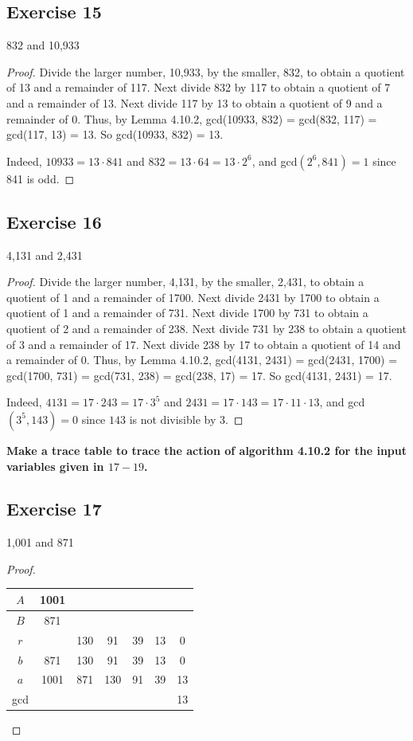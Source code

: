 \documentclass[14pt]{extarticle}
\newcommand{\cy}{\color{cyan}}
\begin{document}
\subsection{Exercise 15}
832 and 10,933

\begin{proof}
Divide the larger number, 10,933, by the smaller, 832, to obtain a quotient of 13 and a remainder of 117. Next divide 832 by 117 to obtain a quotient of 7 and a remainder of 13. Next divide 117 by 13 to obtain a quotient of 9 and a remainder of 0. Thus, by Lemma 4.10.2, gcd(10933, 832) = gcd(832, 117) = gcd(117, 13) = 13. So gcd(10933, 832) = 13.

Indeed, $10933 = 13 \cdot 841$ and $832 = 13 \cdot 64 = 13 \cdot 2^6$, and gcd$(2^6, 841) = 1$ since 841 is odd.
\end{proof}

\subsection{Exercise 16}
4,131 and 2,431

\begin{proof}
Divide the larger number, 4,131, by the smaller, 2,431, to obtain a quotient of 1 and a remainder of 1700. Next divide 2431 by 1700 to obtain a quotient of 1 and a remainder of 731. Next divide 1700 by 731 to obtain a quotient of 2 and a remainder of 238. Next divide 731 by 238 to obtain a quotient of 3 and a remainder of 17. Next divide 238 by 17 to obtain a quotient of 14 and a remainder of 0. Thus, by Lemma 4.10.2, gcd(4131, 2431) = gcd(2431, 1700) = gcd(1700, 731) = gcd(731, 238) = gcd(238, 17) = 17. So gcd(4131, 2431) = 17.

Indeed, $4131 = 17 \cdot 243 = 17 \cdot 3^5$ and $2431 = 17 \cdot 143 = 17 \cdot 11 \cdot 13$, and gcd$(3^5, 143) = 0$ since $143$ is not divisible by 3.
\end{proof}

{\bf \cy Make a trace table to trace the action of algorithm 4.10.2 for the input variables given in $17-19$.}

\subsection{Exercise 17}
1,001 and 871

\begin{proof}
\begin{center}
\begin{tabular}{|c|c|c|c|c|c|c|}
\hline
$A$ &1001 &     &    &    &    & \\
\hline
$B$ & 871 &     &    &    &    & \\
\hline
$r$ &     & 130 & 91 & 39 & 13 & 0 \\
\hline
$b$ & 871 & 130 & 91 & 39 & 13 & 0 \\
\hline
$a$ &1001 & 871 & 130& 91 & 39 & 13 \\
\hline
gcd &     &     &    &    &    & 13 \\
\hline
\end{tabular}
\end{center}
\end{proof}
\end{document}
